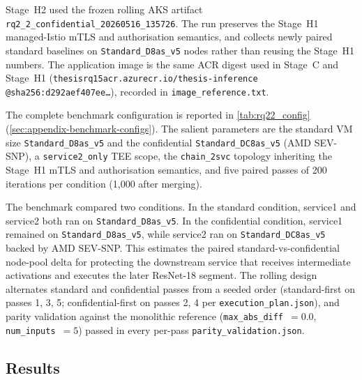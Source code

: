Stage~H2 used the frozen rolling AKS artifact \texttt{rq2\_2\_confidential\_20260516\_135726}.
The run preserves the Stage~H1 managed-Istio mTLS and authorisation semantics, and
collects newly paired standard baselines on \texttt{Standard\_D8as\_v5} nodes
rather than reusing the Stage~H1 numbers. The application image is the same ACR
digest used in Stage~C and Stage~H1
(\texttt{thesisrq15acr.azurecr.io/thesis-inference\\@sha256:d292aef407ee\dots}),
recorded in \texttt{image\_reference.txt}.

The complete benchmark configuration is reported in
\cref{tab:rq22_config} (\cref{sec:appendix-benchmark-configs}). The salient
parameters are the standard VM size \texttt{Standard\_D8as\_v5} and the
confidential \texttt{Standard\_DC8as\_v5} (AMD SEV-SNP), a \texttt{service2\_only}
TEE scope, the \texttt{chain\_2svc} topology inheriting the Stage~H1 mTLS and
authorisation semantics, and five paired passes of 200 iterations per condition
(1,000 after merging).

The benchmark compared two conditions. In the standard condition, service1 and
service2 both ran on \texttt{Standard\_D8as\_v5}. In the confidential
condition, service1 remained on \texttt{Standard\_D8as\_v5}, while service2 ran
on \texttt{Standard\_DC8as\_v5} backed by AMD SEV-SNP. This estimates the paired
standard-vs-confidential node-pool delta for protecting the downstream service
that receives intermediate activations and executes the later ResNet-18 segment.
The rolling design alternates
standard and confidential passes from a seeded order (standard-first on passes
1, 3, 5; confidential-first on passes 2, 4 per
\texttt{execution\_plan.json}), and parity validation against the monolithic
reference (\texttt{max\_abs\_diff}~$=0.0$, \texttt{num\_inputs}~$=5$) passed in
every per-pass \texttt{parity\_validation.json}.

\subsection{Results}

